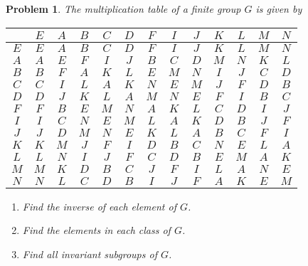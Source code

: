 \documentclass[UTF8,10pt,a4paper]{article}
\theoremstyle{Problem}
\newtheorem{prob}{Problem}
\theoremstyle{Solution}
\begin{document}
\begin{prob}
    The multiplication table of a finite group $G$ is given by
    \begin{table}[h]
        \centering
        \begin{tabular}{ccccccccccccc}
        \multicolumn{1}{c|}{} & $E$ & $A$ & $B$ & $C$ & $D$ & $F$ & $I$ & $J$ & $K$ & $L$ & $M$ & $N$ \\ \hline
        \multicolumn{1}{c|}{$E$} & $E$ & $A$ & $B$ & $C$ & $D$ & $F$ & $I$ & $J$ & $K$ & $L$ & $M$ & $N$ \\
        \multicolumn{1}{c|}{$A$} & $A$ & $E$ & $F$ & $I$ & $J$ & $B$ & $C$ & $D$ & $M$ & $N$ & $K$ & $L$ \\
        \multicolumn{1}{c|}{$B$} & $B$ & $F$ & $A$ & $K$ & $L$ & $E$ & $M$ & $N$ & $I$ & $J$ & $C$ & $D$ \\
        \multicolumn{1}{c|}{$C$} & $C$ & $I$ & $L$ & $A$ & $K$ & $N$ & $E$ & $M$ & $J$ & $F$ & $D$ & $B$ \\
        \multicolumn{1}{c|}{$D$} & $D$ & $J$ & $K$ & $L$ & $A$ & $M$ & $N$ & $E$ & $F$ & $I$ & $B$ & $C$ \\
        \multicolumn{1}{c|}{$F$} & $F$ & $B$ & $E$ & $M$ & $N$ & $A$ & $K$ & $L$ & $C$ & $D$ & $I$ & $J$ \\
        \multicolumn{1}{c|}{$I$} & $I$ & $C$ & $N$ & $E$ & $M$ & $L$ & $A$ & $K$ & $D$ & $B$ & $J$ & $F$ \\
        \multicolumn{1}{c|}{$J$} & $J$ & $D$ & $M$ & $N$ & $E$ & $K$ & $L$ & $A$ & $B$ & $C$ & $F$ & $I$ \\
        \multicolumn{1}{c|}{$K$} & $K$ & $M$ & $J$ & $F$ & $I$ & $D$ & $B$ & $C$ & $N$ & $E$ & $L$ & $A$ \\
        \multicolumn{1}{c|}{$L$} & $L$ & $N$ & $I$ & $J$ & $F$ & $C$ & $D$ & $B$ & $E$ & $M$ & $A$ & $K$ \\
        \multicolumn{1}{c|}{$M$} & $M$ & $K$ & $D$ & $B$ & $C$ & $J$ & $F$ & $I$ & $L$ & $A$ & $N$ & $E$ \\
        \multicolumn{1}{c|}{$N$} & $N$ & $L$ & $C$ & $D$ & $B$ & $I$ & $J$ & $F$ & $A$ & $K$ & $E$ & $M$
        \end{tabular}
        \end{table}
    \begin{enumerate}
        \item[(a)] Find the inverse of each element of $G$.
        \item[(b)] Find the elements in each class of $G$.
        \item[(c)] Find all invariant subgroups of $G$.
    \end{enumerate}
\end{prob}
\end{document}
